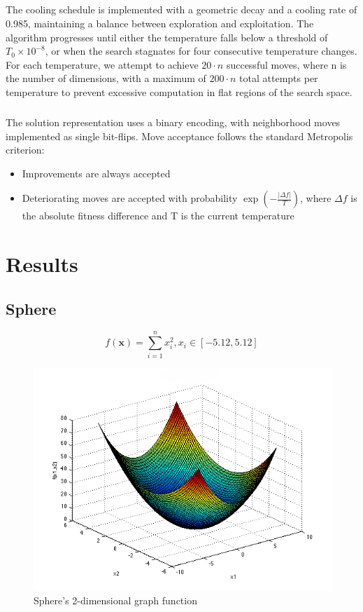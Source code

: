 \documentclass{article}
\begin{document}
\subparagraph{}
The cooling schedule is implemented with a geometric decay and a cooling rate of 0.985, maintaining a balance between exploration and exploitation. The algorithm progresses until either the temperature falls below a threshold of $T_0\times10^{-8}$, or when the search stagnates for four consecutive temperature changes. For each temperature, we attempt to achieve $20\cdot n$ successful moves, where n is the number of dimensions, with a maximum of $200\cdot n$ total attempts per temperature to prevent excessive computation in flat regions of the search space. 

\subparagraph{}
The solution representation uses a binary encoding, with neighborhood moves implemented as single bit-flips. Move acceptance follows the standard Metropolis \cite{m} criterion:
\begin{itemize}
    \item Improvements are always accepted
    \item Deteriorating moves are accepted with probability $\exp\left(-\frac{| \Delta f |}{T}\right)$, where $\Delta f$ is the absolute fitness difference and T is the current temperature
\end{itemize}


\newpage
\section{Results}


\subsection{Sphere}
$$f(\mathbf{x}) = \sum_{i=1}^{n} x_i^2 , x_i \in \left[ -5.12, 5.12 \right] $$


\begin{figure}[!h]
\includegraphics[width=\textwidth,height=\textheight,keepaspectratio]{sphere.png}
  \caption{Sphere's 2-dimensional graph function \cite{sf-uni-sp}}
\end{figure}
\end{document}
